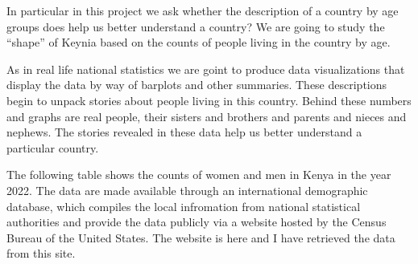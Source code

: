 \documentclass[letterpaper,10pt,english]{jupyterBook}
\begin{document}
\sphinxAtStartPar
In particular in this project we ask whether the description of a country
by age groups does help us better understand a
country? We are going to study the “shape” of Keynia based on the counts of people living in the country
by age.

\sphinxAtStartPar
As in real life national statistics we are goint to produce data visualizations that
display the data by way of barplots and other summaries. These descriptions
begin to unpack stories about people living in this
country. Behind these numbers and graphs are real people, their sisters and brothers and parents and nieces and
nephews. The stories revealed in these data help us better understand a particular country.

\sphinxAtStartPar
The following table shows the counts of women and men in Kenya in the year 2022. The data are made available through an international demographic database, which compiles the local infromation from national statistical authorities and provide the data publicly via a website hosted by the Census Bureau of the United States. The website is here and I have retrieved the data from this site.
\end{document}
